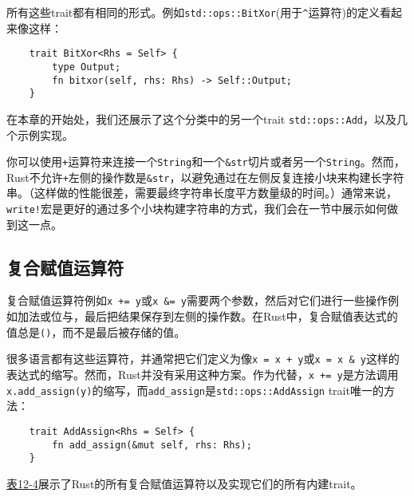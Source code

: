 所有这些trait都有相同的形式。例如\texttt{std::ops::BitXor}(用于\texttt{\^{}}运算符)的定义看起来像这样：
\begin{verbatim}
    trait BitXor<Rhs = Self> {
        type Output;
        fn bitxor(self, rhs: Rhs) -> Self::Output;
    }
\end{verbatim}

在本章的开始处，我们还展示了这个分类中的另一个trait \texttt{std::ops::Add}，以及几个示例实现。

你可以使用\texttt{+}运算符来连接一个\texttt{String}和一个\texttt{\&str}切片或者另一个\texttt{String}。然而，Rust不允许\texttt{+}左侧的操作数是\texttt{\&str}，以避免通过在左侧反复连接小块来构建长字符串。（这样做的性能很差，需要最终字符串长度平方数量级的时间。）通常来说，\texttt{write!}宏是更好的通过多个小块构建字符串的方式，我们会在一节中展示如何做到这一点。

\subsection{复合赋值运算符}\label{assign}
复合赋值运算符例如\texttt{x += y}或\texttt{x \&= y}需要两个参数，然后对它们进行一些操作例如加法或位与，最后把结果保存到左侧的操作数。在Rust中，复合赋值表达式的值总是\texttt{()}，而不是最后被存储的值。

很多语言都有这些运算符，并通常把它们定义为像\texttt{x = x + y}或\texttt{x = x \& y}这样的表达式的缩写。然而，Rust并没有采用这种方案。作为代替，\texttt{x += y}是方法调用\texttt{x.add\_assign(y)}的缩写，而\texttt{add\_assign}是\texttt{std::ops::AddAssign} trait唯一的方法：
\begin{verbatim}
    trait AddAssign<Rhs = Self> {
        fn add_assign(&mut self, rhs: Rhs);
    }
\end{verbatim}

\hyperref[t12-4]{表12-4}展示了Rust的所有复合赋值运算符以及实现它们的所有内建trait。

